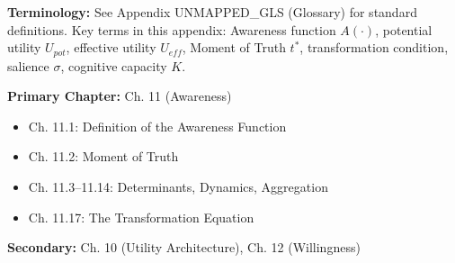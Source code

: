 \begin{tcolorbox}[colback=gray!5!white, colframe=gray!50!black]
\textbf{Terminology:} See Appendix UNMAPPED_GLS (Glossary) for standard definitions.
Key terms in this appendix: Awareness function $A(\cdot)$, potential utility $U_{pot}$,
effective utility $U_{eff}$, Moment of Truth $t^*$, transformation condition,
salience $\sigma$, cognitive capacity $K$.
\end{tcolorbox}

\begin{tcolorbox}[colback=blue!5!white, colframe=blue!50!black, title=Chapter Linkage]
\textbf{Primary Chapter:} Ch. 11 (Awareness)
\begin{itemize}[nosep]
    \item Ch. 11.1: Definition of the Awareness Function
    \item Ch. 11.2: Moment of Truth
    \item Ch. 11.3--11.14: Determinants, Dynamics, Aggregation
    \item Ch. 11.17: The Transformation Equation
\end{itemize}
\textbf{Secondary:} Ch. 10 (Utility Architecture), Ch. 12 (Willingness)
\end{tcolorbox}

